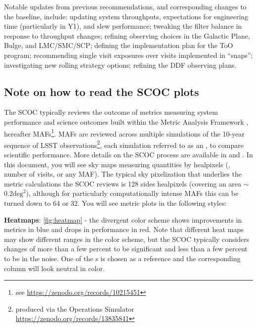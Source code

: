 Notable updates from previous recommendations, and corresponding changes to the baseline, include: updating system throughputs,  expectations for engineering time (particularly in Y1), and slew performance; tweaking the filter balance in response to throughput changes; refining observing choices in the Galactic Plane, Bulge, and LMC/SMC/SCP; defining the implementation plan for the ToO program; recommending single visit exposures over visits implemented in ``snaps''; investigating new rolling strategy options; refining the DDF observing plans.


\subsection{Note on how to read the SCOC plots}

The SCOC typically reviews the outcome of metrics measuring system performance and science outcomes built within the Metric Analysis Framework \citep{2014SPIE.9149E..0BJ}, hereafter MAFs\footnote{see \url{https://zenodo.org/records/10215451}}. MAFs are reviewed across multiple simulations of the 10-year sequence of LSST observations\footnote{produced via the Operations Simulator \url{https://zenodo.org/records/13835841}}, each simulation referred to as an \opsim, to compare scientific performance. More details on the SCOC process are available in  and \citealt{Bianco_2022}. In this document, you will see sky maps measuring quantities by healpixels (\eg, number of visits, or any MAF). The typical sky pixelization that underlies the metric calculations the SCOC reviews is 128 sides healpixels (covering an area \mbox{$\sim$0.2$\mathrm{deg}^2$}), although for particularly computationally intense MAFs this can be turned down to 64 or 32. You will see metric plots in the following styles: 



{\bf Heatmaps}: \autoref{fig:heatmap} -
the divergent color scheme shows improvements in metrics in blue and drops in performance in red. Note that different heat maps may show different ranges in the color scheme, but the SCOC typically considers changes of more than a few percent to be significant and less than a few percent to be in the noise. One of the \opsim s is chosen as a reference and the corresponding column will look neutral in color.

